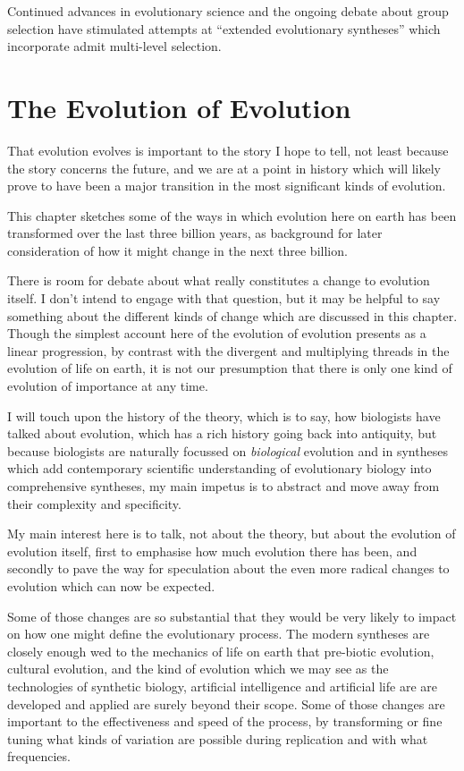 {Continued advances in evolutionary science and the ongoing debate about group selection have stimulated attempts at ``extended evolutionary syntheses'' which incorporate admit multi-level selection.

\chapter{The Evolution of Evolution}\label{EvolutionOfEvolution}


\Cite{dawkins-eoe}

That evolution evolves is important to the story I hope to tell, not least because the story concerns the future, and we are at a point in history which will likely prove to have been a major transition in the most significant kinds of evolution.

This chapter sketches some of the ways in which evolution here on earth has been transformed over the last three billion years, as background for later consideration of how it might change in the next three billion.

There is room for debate about what really constitutes a change to evolution itself.
I don't intend to engage with that question, but it may be helpful to say something about the different kinds of change which are discussed in this chapter.
Though the simplest account here of the evolution of evolution presents as a linear progression, by contrast with the divergent and multiplying threads in the evolution of life on earth, it is not our presumption that there is only one kind of evolution of importance at any time.

I will touch upon the history of the theory, which is to say, how biologists have talked about evolution, which has a rich history going back into antiquity, but because biologists are naturally focussed on \emph{biological} evolution and in syntheses which add contemporary scientific understanding of evolutionary biology into comprehensive syntheses, my main impetus is to abstract and move away from their complexity and specificity.

My main interest here is to talk, not about the theory, but about the evolution of evolution itself, first to emphasise how much evolution there has been, and secondly to pave the way for speculation about the even more radical changes to evolution which can now be expected.

Some of those changes are so substantial that they would be very likely to impact on how one might define the evolutionary process.
The modern syntheses are closely enough wed to the mechanics of life on earth that pre-biotic evolution, cultural evolution, and the kind of evolution which we may see as the technologies of synthetic biology, artificial intelligence and artificial life are are developed and applied are surely beyond their scope. 
Some of those changes are important to the effectiveness and speed of the process, by transforming or fine tuning what kinds of variation are possible during replication and with what frequencies. 

}
